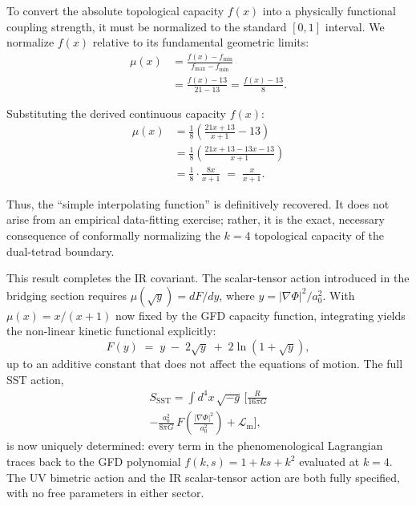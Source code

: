 \documentclass[twocolumn]{iopjournal}
\begin{document}
To convert the absolute topological capacity $f(x)$ into a physically functional coupling strength, it must be normalized to the standard $[0, 1]$ interval. We normalize $f(x)$ relative to its fundamental geometric limits:
\begin{align}
\mu(x) &= \frac{f(x) - f_{\min}}{f_{\max} - f_{\min}} \nonumber \\
&= \frac{f(x) - 13}{21 - 13} = \frac{f(x) - 13}{8}.
\end{align}

Substituting the derived continuous capacity $f(x)$:
\begin{align}
\mu(x) &= \frac{1}{8} \left( \frac{21x + 13}{x + 1} - 13 \right) \nonumber \\
&= \frac{1}{8} \left( \frac{21x + 13 - 13x - 13}{x + 1} \right) \nonumber \\
&= \frac{1}{8} \cdot \frac{8x}{x + 1} \;=\; \frac{x}{x + 1}.
\end{align}

Thus, the ``simple interpolating function'' is definitively recovered. It does not arise from an empirical data-fitting exercise; rather, it is the exact, necessary consequence of conformally normalizing the $k=4$ topological capacity of the dual-tetrad boundary.

This result completes the IR covariant. The scalar-tensor action introduced in the bridging section requires $\mu(\sqrt{y}) = dF/dy$, where $y = |\nabla\Phi|^2/a_0^2$. With $\mu(x) = x/(x+1)$ now fixed by the GFD capacity function, integrating yields the non-linear kinetic functional explicitly:
\begin{equation}
F(y) \;=\; y \;-\; 2\sqrt{y} \;+\; 2\ln\!\left(1 + \sqrt{y}\right),
\end{equation}
up to an additive constant that does not affect the equations of motion. The full SST action,
\begin{multline}
S_{\mathrm{SST}} = \int\! d^4x\,\sqrt{-g}\,\biggl[\frac{R}{16\pi G} \\
- \frac{a_0^2}{8\pi G}\,F\!\!\left(\frac{|\nabla\Phi|^2}{a_0^2}\right) + \mathcal{L}_{\mathrm{m}}\biggr],
\end{multline}
is now uniquely determined: every term in the phenomenological Lagrangian traces back to the GFD polynomial $f(k,s) = 1 + ks + k^2$ evaluated at $k = 4$. The UV bimetric action and the IR scalar-tensor action are both fully specified, with no free parameters in either sector.
\end{document}
